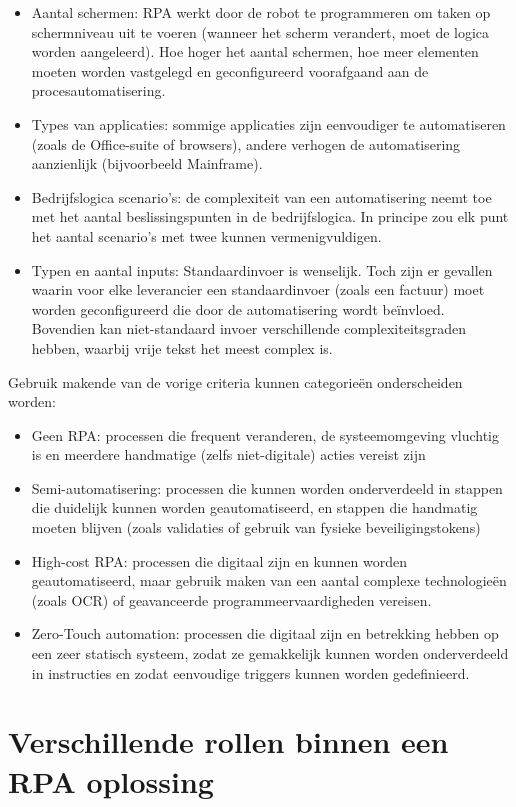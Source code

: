 \begin{itemize}
	\item Aantal schermen: RPA werkt door de robot te programmeren om taken op schermniveau uit te voeren (wanneer het scherm verandert, moet de logica worden aangeleerd). Hoe hoger het aantal schermen, hoe meer elementen moeten worden vastgelegd en geconfigureerd voorafgaand aan de procesautomatisering.
	\item Types van applicaties: sommige applicaties zijn eenvoudiger te automatiseren (zoals de Office-suite of browsers), andere verhogen de automatisering aanzienlijk (bijvoorbeeld Mainframe).
	\item Bedrijfslogica scenario's: de complexiteit van een automatisering neemt toe met het aantal beslissingspunten in de bedrijfslogica. In principe zou elk punt het aantal scenario's met twee kunnen vermenigvuldigen.
	\item Typen en aantal inputs: Standaardinvoer is wenselijk. Toch zijn er gevallen waarin voor elke leverancier een standaardinvoer (zoals een factuur) moet worden geconfigureerd die door de automatisering wordt beïnvloed. Bovendien kan niet-standaard invoer verschillende complexiteitsgraden hebben, waarbij vrije tekst het meest complex is.
\end{itemize}

Gebruik makende van de vorige criteria kunnen categorieën onderscheiden worden:
\begin{itemize}
	\item Geen RPA: processen die frequent veranderen, de systeemomgeving vluchtig is en meerdere handmatige (zelfs niet-digitale) acties vereist zijn
	\item Semi-automatisering: processen die kunnen worden onderverdeeld in stappen die duidelijk kunnen worden geautomatiseerd, en stappen die handmatig moeten blijven (zoals validaties of gebruik van fysieke beveiligingstokens)
	\item High-cost RPA: processen die digitaal zijn en kunnen worden geautomatiseerd, maar gebruik maken van een aantal complexe technologieën (zoals OCR) of geavanceerde programmeervaardigheden vereisen.
	\item Zero-Touch automation: processen die digitaal zijn en betrekking hebben op een zeer statisch systeem, zodat ze gemakkelijk kunnen worden onderverdeeld in instructies en zodat eenvoudige triggers kunnen worden gedefinieerd.
\end{itemize}

\section{Verschillende rollen binnen een RPA oplossing}

